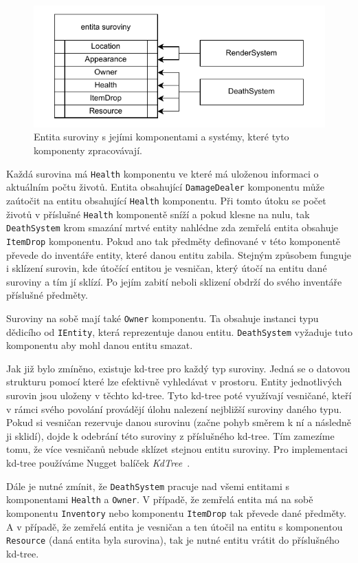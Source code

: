 \begin{figure}[!htb]
  \centering
  \includegraphics[width=0.8\linewidth]{img/resource.pdf}
  \caption{Entita suroviny s jejími komponentami a systémy, které tyto komponenty zpracovávají.}
  \label{fig:resource}
\end{figure}

Každá surovina má \texttt{Health} komponentu ve které má uloženou informaci o aktuálním počtu životů. Entita obsahující \texttt{DamageDealer} komponentu může zaútočit na entitu obsahující \texttt{Health} komponentu. Při tomto útoku se počet životů v příslušné \texttt{Health} komponentě sníží a pokud klesne na nulu, tak \texttt{DeathSystem} krom smazání mrtvé entity nahlédne zda zemřelá entita obsahuje \texttt{ItemDrop} komponentu. Pokud ano tak předměty definované v této komponentě převede do inventáře entity, které danou entitu zabila. Stejným způsobem funguje i sklízení surovin, kde útočící entitou je vesničan, který útočí na entitu dané suroviny a tím jí sklízí. Po jejím zabití neboli sklizení obdrží do svého inventáře příslušné předměty.

Suroviny na sobě mají také \texttt{Owner} komponentu. Ta obsahuje instanci typu dědicího od \texttt{IEntity}, která reprezentuje danou entitu. \texttt{DeathSystem} vyžaduje tuto komponentu aby mohl danou entitu smazat.

Jak již bylo zmíněno, existuje kd-tree pro každý typ suroviny. Jedná se o datovou strukturu pomocí které lze efektivně vyhledávat v prostoru. Entity jednotlivých surovin jsou uloženy v těchto kd-tree. Tyto kd-tree poté využívají vesničané, kteří v rámci svého povolání provádějí úlohu nalezení nejbližší suroviny daného typu. Pokud si vesničan rezervuje danou surovinu (začne pohyb směrem k ní a následně ji sklidí), dojde k odebrání této suroviny z příslušného kd-tree. Tím zamezíme tomu, že více vesničanů nebude sklízet stejnou entitu suroviny. Pro implementaci kd-tree používáme Nugget balíček \textit{KdTree}~\cite{KdTree}.

Dále je nutné zmínit, že \texttt{DeathSystem} pracuje nad všemi entitami s komponentami \texttt{Health} a \texttt{Owner}. V případě, že zemřelá entita má na sobě komponentu \texttt{Inventory} nebo komponentu \texttt{ItemDrop} tak převede dané předměty. A v případě, že zemřelá entita je vesničan a ten útočil na entitu s komponentou \texttt{Resource} (daná entita byla surovina), tak je nutné entitu vrátit do příslušného kd-tree.

